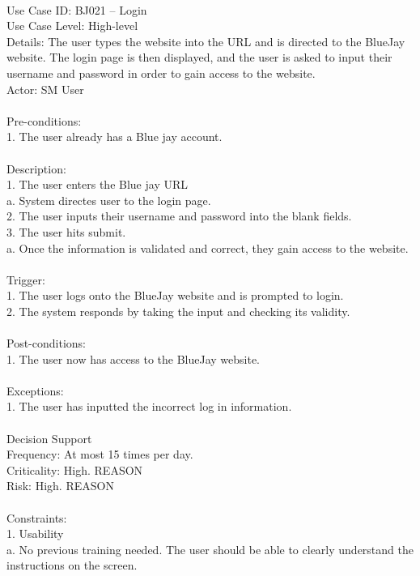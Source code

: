 \documentclass{report}
\begin{document}
\\
Use Case ID: BJ021 – Login\\
Use Case Level: High-level\\
Details:  The user types the website into the URL and is directed to the BlueJay website. The login page is then displayed, and the user is asked to input their username and password in order to gain access to the website.\\
Actor: SM User\\
\\
Pre-conditions: \\
1.	The user already has a Blue jay account.\\
\\
Description:\\
1.	The user enters the Blue jay URL\\
a.	System directes user to the login page.\\
2.	The user inputs their username and password into the blank fields.\\
3.	The user hits submit.\\
a.	Once the information is validated and correct, they gain access to the website.\\
\\
Trigger: \\
1.	The user logs onto the BlueJay website and is prompted to login.\\
2.	The system responds by taking the input and checking its validity.\\
\\
Post-conditions:\\
1.	The user now has access to the BlueJay website.\\
\\
Exceptions:\\
1.	The user has inputted the incorrect log in information.\\
\\
Decision Support\\
     Frequency: At most 15 times per day.\\
     Criticality: High. REASON\\
     Risk: High. REASON\\
     \\
Constraints: \\
1. Usability\\
a.	 No previous training needed. The user should be able to clearly understand the instructions on the screen.\\
\end{document}

